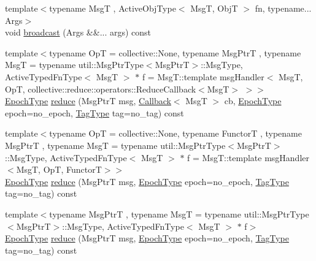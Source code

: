 \begin{DoxyCompactItemize}
\item 
{\footnotesize template$<$typename MsgT , Active\+Obj\+Type$<$ Msg\+T, Obj\+T $>$ fn, typename... Args$>$ }\\void \hyperlink{structvt_1_1objgroup_1_1proxy_1_1_proxy_ad4f1ddeb5b09f01643b17a93bbbe82e9}{broadcast} (Args \&\&... args) const
\item 
{\footnotesize template$<$typename OpT  = collective\+::\+None, typename Msg\+PtrT , typename MsgT  = typename util\+::\+Msg\+Ptr\+Type$<$\+Msg\+Ptr\+T$>$\+::\+Msg\+Type, Active\+Typed\+Fn\+Type$<$ Msg\+T $>$ $\ast$ f = Msg\+T\+::template msg\+Handler$<$      Msg\+T, Op\+T, collective\+::reduce\+::operators\+::\+Reduce\+Callback$<$\+Msg\+T$>$    $>$$>$ }\\\hyperlink{namespacevt_a985a5adf291c34a3ca263b3378388236}{Epoch\+Type} \hyperlink{structvt_1_1objgroup_1_1proxy_1_1_proxy_a35c28f545796b6383d795b833b0cf9c3}{reduce} (Msg\+PtrT msg, \hyperlink{namespacevt_a36db99df4c973d48b1118a293fff533f}{Callback}$<$ MsgT $>$ cb, \hyperlink{namespacevt_a985a5adf291c34a3ca263b3378388236}{Epoch\+Type} epoch=no\+\_\+epoch, \hyperlink{namespacevt_a84ab281dae04a52a4b243d6bf62d0e52}{Tag\+Type} tag=no\+\_\+tag) const
\item 
{\footnotesize template$<$typename OpT  = collective\+::\+None, typename FunctorT , typename Msg\+PtrT , typename MsgT  = typename util\+::\+Msg\+Ptr\+Type$<$\+Msg\+Ptr\+T$>$\+::\+Msg\+Type, Active\+Typed\+Fn\+Type$<$ Msg\+T $>$ $\ast$ f = Msg\+T\+::template msg\+Handler$<$\+Msg\+T, Op\+T, Functor\+T$>$$>$ }\\\hyperlink{namespacevt_a985a5adf291c34a3ca263b3378388236}{Epoch\+Type} \hyperlink{structvt_1_1objgroup_1_1proxy_1_1_proxy_a9be2268a987c47224798067862e89ab5}{reduce} (Msg\+PtrT msg, \hyperlink{namespacevt_a985a5adf291c34a3ca263b3378388236}{Epoch\+Type} epoch=no\+\_\+epoch, \hyperlink{namespacevt_a84ab281dae04a52a4b243d6bf62d0e52}{Tag\+Type} tag=no\+\_\+tag) const
\item 
{\footnotesize template$<$typename Msg\+PtrT , typename MsgT  = typename util\+::\+Msg\+Ptr\+Type$<$\+Msg\+Ptr\+T$>$\+::\+Msg\+Type, Active\+Typed\+Fn\+Type$<$ Msg\+T $>$ $\ast$ f$>$ }\\\hyperlink{namespacevt_a985a5adf291c34a3ca263b3378388236}{Epoch\+Type} \hyperlink{structvt_1_1objgroup_1_1proxy_1_1_proxy_a9c3426ebd305b7b0643bd91fbb79cbe7}{reduce} (Msg\+PtrT msg, \hyperlink{namespacevt_a985a5adf291c34a3ca263b3378388236}{Epoch\+Type} epoch=no\+\_\+epoch, \hyperlink{namespacevt_a84ab281dae04a52a4b243d6bf62d0e52}{Tag\+Type} tag=no\+\_\+tag) const

\end{DoxyCompactItemize}
